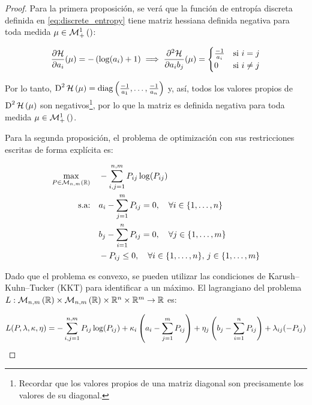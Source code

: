 \begin{proof}
	Para la primera proposición, se verá que la función de entropía discreta definida en \autoref{eq:discrete_entropy} tiene matriz hessiana definida negativa para toda medida $\mu\in\mathcal{M}_+^1\left(\right)$:

	\begin{equation}
		\frac{\partial\mathcal{H}}{\partial a_i}(\mu) = -\left(\log(a_i) + 1\right)
		\implies \frac{\partial^2\mathcal{H}}{\partial a_i b_j}(\mu) =
		\begin{cases}
			\frac{-1}{a_i} & \text{si } i=j     \\
			0              & \text{si } i\neq j
		\end{cases}
	\end{equation}

	Por lo tanto, $\operatorname{D}^2 \mathcal{H}\left(\mu\right) = \operatorname{diag}\left(\frac{-1}{a_1},\ldots,\frac{-1}{a_n}\right)$ y, así, todos los valores propios de $\operatorname{D}^2 \mathcal{H}\left(\mu\right)$ son negativos\footnote{Recordar que los valores propios de una matriz diagonal son precisamente los valores de su diagonal.}, por lo que la matriz es definida negativa para toda medida $\mu\in\mathcal{M}_+^1\left(\right)$.

	Para la segunda proposición, el problema de optimización con sus restricciones escritas de forma explícita es:

	\begin{align}
		\max_{P\in\mathcal{M}_{n,m}\left(\mathbb{R}\right)} \quad & -\sum_{i,j=1}^{n,m} P_{ij}\log(P_{ij})                                \\
		\text{s.a:} \quad                      & a_i - \sum_{j=1}^m P_{ij} = 0,\quad \forall i\in\{1,\ldots,n\}        \\
		                                       & b_j - \sum_{i=1}^n P_{ij} = 0,\quad \forall j\in\{1,\ldots,m\}        \\
		                                       & -P_{ij}\leq 0, \quad \forall i\in\{1,\ldots,n\},\, j\in\{1,\ldots,m\}
	\end{align}

	Dado que el problema es convexo, se pueden utilizar las condiciones de Karush–Kuhn–Tucker (KKT) para identificar a un máximo. El lagrangiano del problema $L:\mathcal{M}_{n,m}\left(\mathbb{R}\right)\times\mathcal{M}_{n,m}\left(\mathbb{R}\right)\times\mathbb{R}^n\times\mathbb{R}^m\to\mathbb{R}$ es:

	\begin{equation}
		L(P,\lambda,\kappa,\eta) =
		-\sum_{i,j=1}^{n,m} P_{ij}\log(P_{ij})
		+ \kappa_i \left(a_i - \sum_{j=1}^m P_{ij}\right)
		+ \eta_j \left(b_j - \sum_{i=1}^n P_{ij}\right)
		+ \lambda_{ij}(-P_{ij})
	\end{equation}


\end{proof}
